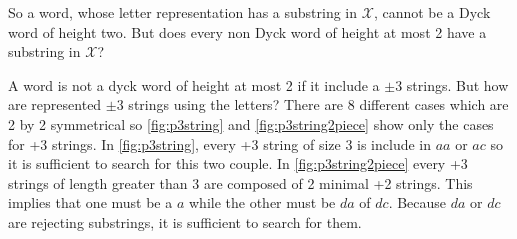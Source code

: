 \begin{tproof}
    So a word, whose letter representation has a substring in $\mathcal{X}$,
    cannot be a Dyck word of height two. But does every non Dyck word of height
    at most 2 have a substring in $\mathcal{X}$?

    A word is not a dyck word of height at most 2 if it include a $\pm 3$ strings.
    But how are represented $\pm 3$ strings using the letters? There are 8
    different cases which are 2 by 2 symmetrical so \autoref{fig:p3string}
    and \autoref{fig:p3string2piece} show only the cases for +3 strings. In
    \autoref{fig:p3string}, every +3 string of size 3 is include in $aa$ or
    $ac$ so it is sufficient to search for this two couple. In \autoref{fig:p3string2piece}
    every +3 strings of length greater than 3 are composed of 2 minimal +2
    strings. This implies that one must be a $a$ while the other must be $da$
    of $dc$. Because $da$ or $dc$ are rejecting substrings, it is sufficient
    to search for them.

    \begin{figure}[h!]
        \begin{minipage}{.35\textwidth}
            \centering
\end{minipage}
\end{figure}
\end{tproof}
